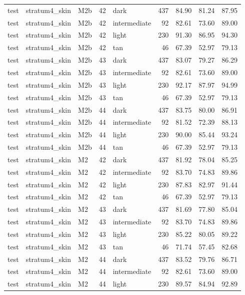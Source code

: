 \begin{tabular}{lllrlrrrr}
test & stratum4\_skin & M2b & 42 & dark & 437 & 84.90 & 81.24 & 87.95 \\
test & stratum4\_skin & M2b & 42 & intermediate & 92 & 82.61 & 73.60 & 89.00 \\
test & stratum4\_skin & M2b & 42 & light & 230 & 91.30 & 86.95 & 94.30 \\
test & stratum4\_skin & M2b & 42 & tan & 46 & 67.39 & 52.97 & 79.13 \\
test & stratum4\_skin & M2b & 43 & dark & 437 & 83.07 & 79.27 & 86.29 \\
test & stratum4\_skin & M2b & 43 & intermediate & 92 & 82.61 & 73.60 & 89.00 \\
test & stratum4\_skin & M2b & 43 & light & 230 & 92.17 & 87.97 & 94.99 \\
test & stratum4\_skin & M2b & 43 & tan & 46 & 67.39 & 52.97 & 79.13 \\
test & stratum4\_skin & M2b & 44 & dark & 437 & 83.75 & 80.00 & 86.91 \\
test & stratum4\_skin & M2b & 44 & intermediate & 92 & 81.52 & 72.39 & 88.13 \\
test & stratum4\_skin & M2b & 44 & light & 230 & 90.00 & 85.44 & 93.24 \\
test & stratum4\_skin & M2b & 44 & tan & 46 & 67.39 & 52.97 & 79.13 \\
test & stratum4\_skin & M2 & 42 & dark & 437 & 81.92 & 78.04 & 85.25 \\
test & stratum4\_skin & M2 & 42 & intermediate & 92 & 83.70 & 74.83 & 89.86 \\
test & stratum4\_skin & M2 & 42 & light & 230 & 87.83 & 82.97 & 91.44 \\
test & stratum4\_skin & M2 & 42 & tan & 46 & 67.39 & 52.97 & 79.13 \\
test & stratum4\_skin & M2 & 43 & dark & 437 & 81.69 & 77.80 & 85.04 \\
test & stratum4\_skin & M2 & 43 & intermediate & 92 & 83.70 & 74.83 & 89.86 \\
test & stratum4\_skin & M2 & 43 & light & 230 & 85.22 & 80.05 & 89.22 \\
test & stratum4\_skin & M2 & 43 & tan & 46 & 71.74 & 57.45 & 82.68 \\
test & stratum4\_skin & M2 & 44 & dark & 437 & 83.52 & 79.76 & 86.71 \\
test & stratum4\_skin & M2 & 44 & intermediate & 92 & 82.61 & 73.60 & 89.00 \\
test & stratum4\_skin & M2 & 44 & light & 230 & 89.57 & 84.94 & 92.89 \\

\end{tabular}
